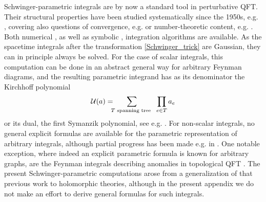 \documentclass[11pt]{amsart}
\numberwithin{equation}{section}
\numberwithin{figure}{section}
\numberwithin{table}{section}
\begin{document}
Schwinger-parametric integrals are by now a standard tool in perturbative QFT. Their structural properties have been studied systematically since the 1950s, e.g.  \cite{nakanishi_general_1957,nakanishi_graph_1971},  covering also questions of convergence, e.g. \cite{brown_angles_2013} or number-theoretic content, e.g. \cite{brown_periods_2010}. Both numerical \cite{bogner_resolution_2008,borowka_numerical_2013,borinsky_tropical_2023a}, as well as symbolic \cite{panzer_algorithms_2015},  integration algorithms are available. As the spacetime integrals after the transformation \cref{Schwinger_trick} are Gaussian, they can in principle always be solved. For the case of scalar integrals, this computation can be done in an abstract general way  for arbitrary Feynman diagrams, and the resulting parametric integrand has as its denominator the Kirchhoff polynomial   
\begin{align}\label{def:Kirchhoff_polynomial}
	\mathcal U(a) = \hspace{-.2cm}\sum_{T \textnormal{ spanning tree }}~ \prod_{e\in T} a_e
\end{align}
or its dual, the first Symanzik polynomial, see e.g.  \cite{bogner_feynman_2010}. 
For non-scalar integrals, no general explicit formulas are available for the parametric representation of arbitrary integrals, although partial progress has been made e.g. in \cite{kreimer_quantization_2013,golz_new_2017}. One notable exception, where indeed an explicit parametric formula is known for arbitrary graphs, are the  Feynman integrals describing anomalies in topological QFT \cite{balduf_combinatorial_2025,balduf_topological_2025}. The present Schwinger-parametric computations arose from a generalization of that previous work to holomorphic theories, although in the present appendix we do not make an effort to derive general formulas for such integrals.
\end{document}
